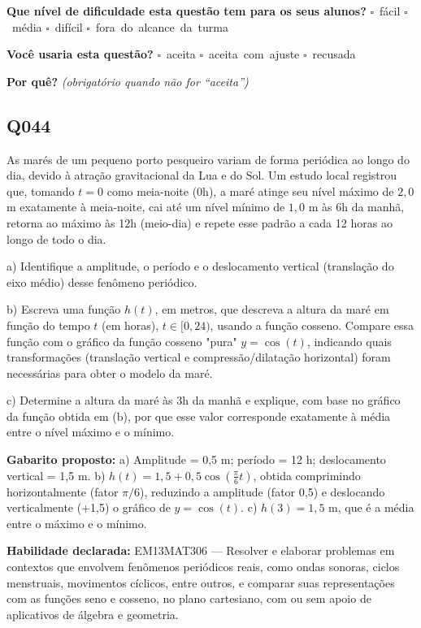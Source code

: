 \documentclass[11pt,a4paper]{article}
\begin{document}
\textbf{Que nível de dificuldade esta questão tem para os seus alunos?}\quad
\mbox{$\square$~fácil} \quad \mbox{$\square$~média} \quad
\mbox{$\square$~difícil} \quad \mbox{$\square$~fora do alcance da turma}

\textbf{Você usaria esta questão?}\quad
\mbox{$\square$~aceita} \quad \mbox{$\square$~aceita com ajuste} \quad
\mbox{$\square$~recusada}

\textbf{Por quê?} \emph{(obrigatório quando não for ``aceita'')}

\underline{\hspace{\linewidth}}

\underline{\hspace{\linewidth}}
\vspace{0.6em}

\begin{samepage}
\subsection*{Q044}
As marés de um pequeno porto pesqueiro variam de forma periódica ao longo do dia, devido à atração gravitacional da Lua e do Sol. Um estudo local registrou que, tomando $t = 0$ como meia-noite (0h), a maré atinge seu nível máximo de $2{,}0$ m exatamente à meia-noite, cai até um nível mínimo de $1{,}0$ m às 6h da manhã, retorna ao máximo às 12h (meio-dia) e repete esse padrão a cada 12 horas ao longo de todo o dia.

a) Identifique a amplitude, o período e o deslocamento vertical (translação do eixo médio) desse fenômeno periódico.

b) Escreva uma função $h(t)$, em metros, que descreva a altura da maré em função do tempo $t$ (em horas), $t \in [0,24)$, usando a função cosseno. Compare essa função com o gráfico da função cosseno "pura" $y=\cos(t)$, indicando quais transformações (translação vertical e compressão/dilatação horizontal) foram necessárias para obter o modelo da maré.

c) Determine a altura da maré às 3h da manhã e explique, com base no gráfico da função obtida em (b), por que esse valor corresponde exatamente à média entre o nível máximo e o mínimo.

\textbf{Gabarito proposto:} a) Amplitude = 0,5 m; período = 12 h; deslocamento vertical = 1,5 m. b) $h(t) = 1{,}5 + 0{,}5\cos\left(\frac{\pi}{6}t\right)$, obtida comprimindo horizontalmente (fator $\pi/6$), reduzindo a amplitude (fator 0,5) e deslocando verticalmente (+1,5) o gráfico de $y=\cos(t)$. c) $h(3) = 1{,}5$ m, que é a média entre o máximo e o mínimo.

\textbf{Habilidade declarada:} EM13MAT306 --- Resolver e elaborar problemas em contextos que envolvem fenômenos periódicos reais, como ondas sonoras, ciclos menstruais, movimentos cíclicos, entre outros, e comparar suas representações com as funções seno e cosseno, no plano cartesiano, com ou sem apoio de aplicativos de álgebra e geometria.
\end{samepage}
\end{document}
